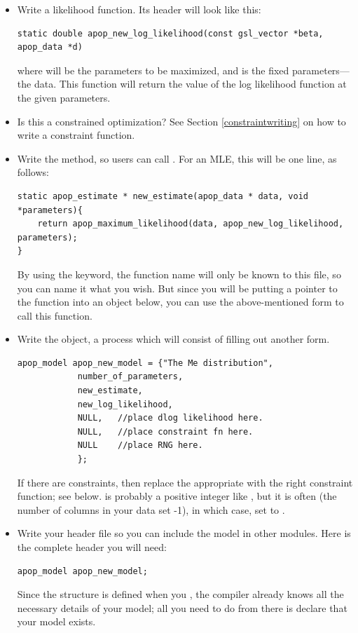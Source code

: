 \begin{itemize}
\item Write a likelihood function. Its header will look like this:
\begin{lstlisting}
static double apop_new_log_likelihood(const gsl_vector *beta, apop_data *d)
\end{lstlisting}
where  will be the parameters to be maximized, and  is the fixed parameters---the data. 
This function will return the value of the log likelihood function at the given parameters.

\item Is this a constrained optimization? See Section
\ref{constraintwriting} on how to write a constraint function.

\item Write the  method, so users can call 
. For an MLE, this will be one line,
as follows:
\begin{lstlisting}
static apop_estimate * new_estimate(apop_data * data, void *parameters){
    return apop_maximum_likelihood(data, apop_new_log_likelihood, parameters);
}
\end{lstlisting}
By using the  keyword, the function name will only be
known to this file, so you can name it what you wish.  But since you
will be putting a pointer to the function into an object below, you
can use the above-mentioned 
form to call this function. 


\item Write the object, a process which will consist of filling out
another form. 
\begin{lstlisting}
apop_model apop_new_model = {"The Me distribution", 
            number_of_parameters, 
            new_estimate,
            new_log_likelihood, 
            NULL,   //place dlog likelihood here.
            NULL,   //place constraint fn here.
            NULL    //place RNG here.
            };
\end{lstlisting}
If there are constraints, then replace the appropriate  with the right constraint function; see below.
 is probably a positive integer like , but
it is often (the number of columns in your data set -1), in which case,
set  to .

\item Write your header file so you can include the model in other
modules. Here is the complete header you will need:
\begin{lstlisting}
apop_model apop_new_model;
\end{lstlisting}
Since the  structure is defined when you , the compiler already knows all the necessary
details of your model; all you need to do from there is declare that
your model exists.



\end{itemize}
